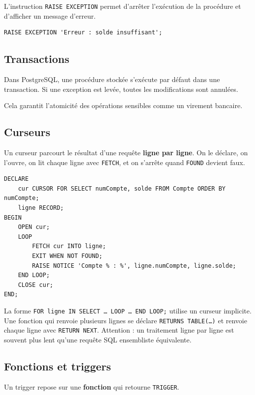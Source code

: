 \documentclass[11pt]{article}
\begin{document}
L’instruction \texttt{RAISE EXCEPTION} permet d’arrêter l’exécution
de la procédure et d’afficher un message d’erreur.

\begin{verbatim}
RAISE EXCEPTION 'Erreur : solde insuffisant';
\end{verbatim}

\bigskip

\subsection*{Transactions}

Dans PostgreSQL, une procédure stockée s’exécute par défaut
dans une transaction.  
Si une exception est levée, toutes les modifications sont annulées.

Cela garantit l’atomicité des opérations sensibles comme un virement bancaire.

\bigskip

\subsection*{Curseurs}

Un curseur parcourt le résultat d'une requête \textbf{ligne par ligne}. On le déclare, on l'ouvre,
on lit chaque ligne avec \texttt{FETCH}, et on s'arrête quand \texttt{FOUND} devient faux.

\begin{verbatim}
DECLARE
    cur CURSOR FOR SELECT numCompte, solde FROM Compte ORDER BY numCompte;
    ligne RECORD;
BEGIN
    OPEN cur;
    LOOP
        FETCH cur INTO ligne;
        EXIT WHEN NOT FOUND;
        RAISE NOTICE 'Compte % : %', ligne.numCompte, ligne.solde;
    END LOOP;
    CLOSE cur;
END;
\end{verbatim}

La forme \texttt{FOR ligne IN SELECT \ldots{} LOOP \ldots{} END LOOP;} utilise un curseur implicite.
Une fonction qui renvoie plusieurs lignes se déclare \texttt{RETURNS TABLE(\ldots)} et renvoie chaque
ligne avec \texttt{RETURN NEXT}. Attention : un traitement ligne par ligne est souvent plus lent qu'une
requête SQL ensembliste équivalente.

\bigskip

\subsection*{Fonctions et triggers}

Un trigger repose sur une \textbf{fonction} qui retourne \texttt{TRIGGER}.
\end{document}

